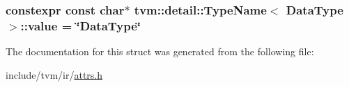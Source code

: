 \subsubsection[{\texorpdfstring{value}{value}}]{\setlength{\rightskip}{0pt plus 5cm}constexpr const char$\ast$ {\bf tvm\+::detail\+::\+Type\+Name}$<$ {\bf Data\+Type} $>$\+::value = \char`\"{}Data\+Type\char`\"{}\hspace{0.3cm}{\ttfamily [static]}}\hypertarget{structtvm_1_1detail_1_1TypeName_3_01DataType_01_4_a53fef3c8f6efd6960f326efdc7247191}{}\label{structtvm_1_1detail_1_1TypeName_3_01DataType_01_4_a53fef3c8f6efd6960f326efdc7247191}


The documentation for this struct was generated from the following file\+:\begin{DoxyCompactItemize}
\item 
include/tvm/ir/\hyperlink{ir_2attrs_8h}{attrs.\+h}\end{DoxyCompactItemize}

